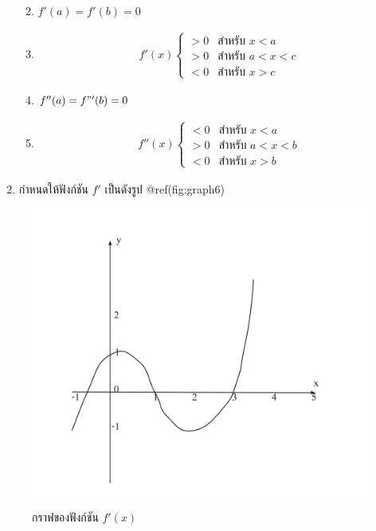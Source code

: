 \documentclass[
]{book}
\begin{document}
\begin{enumerate}
  \begin{enumerate}
  \def\labelenumii{\arabic{enumii}.}
  \item
    \(f'(a) = f'(b) = 0\)
  \item
    \begin{equation}   \begin{aligned}
        f'(x)  \begin{cases}
        > 0 &\text{สำหรับ $x<a$} \\
        > 0 &\text{สำหรับ $a<x<c$} \\
        < 0 &\text{สำหรับ $x>c$}
        \end{cases}
      \end{aligned} \end{equation}
  \item
    \(f''(a) = f"'(b) = 0\)
  \item
    \begin{equation}   \begin{aligned}
        f''(x) \begin{cases}
        < 0 &\text{สำหรับ $x<a$} \\
        > 0 &\text{สำหรับ $a<x<b$} \\
        < 0 &\text{สำหรับ $x>b$}
        \end{cases}
      \end{aligned} \end{equation}
  \end{enumerate}
\item
  กำหนดให้ฟังก์ชัน \(f'\) เป็นดังรูป @ref(fig:graph6)
\end{enumerate}

\begin{figure}

{\centering \includegraphics[width=0.5\linewidth]{images/graph6} 

}

\caption{กราฟของฟังก์ชัน $f'(x)$}\label{fig:graph6}
\end{figure}
\end{document}

